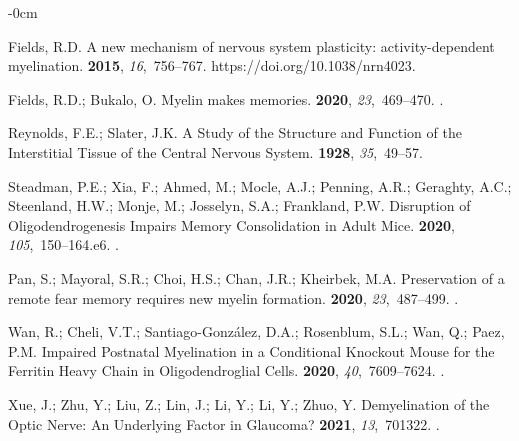 \documentclass[brainsci, %
               review,accept,pdftex,moreauthors
               ]{Definitions/mdpi}
\begin{document}
\begin{adjustwidth}{-\extralength}{0cm}
\begin{thebibliography}{999}
Fields, R.D.
\newblock A new mechanism of nervous system plasticity: activity-dependent
  myelination.
 {\bf 2015}, {\em 16},~756--767.
  {{https://doi.org/10.1038/nrn4023}}.

Fields, R.D.; Bukalo, O.
\newblock Myelin makes memories.
 {\bf 2020}, {\em 23},~469--470.
.

Reynolds, F.E.; Slater, J.K.
\newblock A {Study} of the {Structure} and {Function} of the {Interstitial}
  {Tissue} of the {Central} {Nervous} {System}.
 {\bf 1928}, {\em 35},~49--57.

Steadman, P.E.; Xia, F.; Ahmed, M.; Mocle, A.J.; Penning, A.R.; Geraghty, A.C.;
  Steenland, H.W.; Monje, M.; Josselyn, S.A.; Frankland, P.W.
\newblock Disruption of {Oligodendrogenesis} {Impairs} {Memory} {Consolidation}
  in {Adult} {Mice}.
 {\bf 2020}, {\em 105},~150--164.e6.
.

Pan, S.; Mayoral, S.R.; Choi, H.S.; Chan, J.R.; Kheirbek, M.A.
\newblock Preservation of a remote fear memory requires new myelin formation.
 {\bf 2020}, {\em 23},~487--499.
.

Wan, R.; Cheli, V.T.; Santiago-González, D.A.; Rosenblum, S.L.; Wan, Q.; Paez,
  P.M.
\newblock Impaired {Postnatal} {Myelination} in a {Conditional} {Knockout}
  {Mouse} for the {Ferritin} {Heavy} {Chain} in {Oligodendroglial} {Cells}.
 {\bf 2020}, {\em 40},~7609--7624.
.

Xue, J.; Zhu, Y.; Liu, Z.; Lin, J.; Li, Y.; Li, Y.; Zhuo, Y.
\newblock Demyelination of the {Optic} {Nerve}: {An} {Underlying} {Factor} in
  {Glaucoma}?
 {\bf 2021}, {\em 13},~701322.
.


\end{thebibliography}
\end{adjustwidth}
\end{document}
